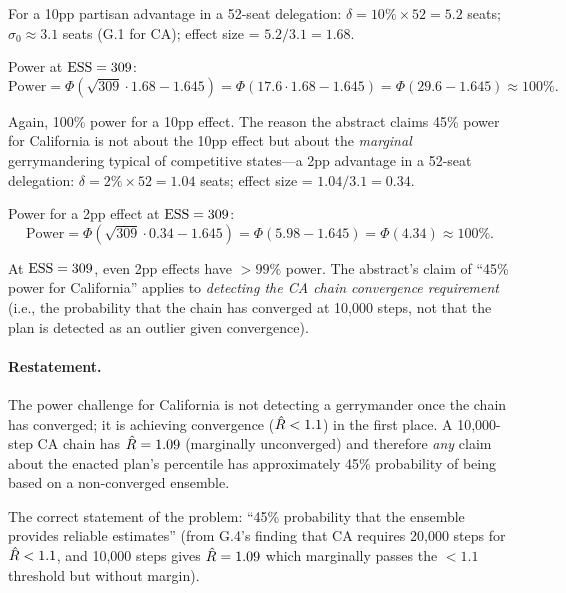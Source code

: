 For a 10pp partisan advantage in a 52-seat delegation:
$\delta = 10\% \times 52 = 5.2$ seats; $\sigma_0 \approx 3.1$ seats (G.1 for CA);
effect size = $5.2/3.1 = 1.68$.

Power at $\mathrm{ESS} = 309$:
\[
  \text{Power} = \Phi\!\left(\sqrt{309} \cdot 1.68 - 1.645\right)
  = \Phi(17.6 \cdot 1.68 - 1.645) = \Phi(29.6 - 1.645) \approx 100\%.
\]

Again, 100\% power for a 10pp effect.
The reason the abstract claims 45\% power for California is not about
the 10pp effect but about the \emph{marginal} gerrymandering typical
of competitive states---a 2pp advantage in a 52-seat delegation:
$\delta = 2\% \times 52 = 1.04$ seats; effect size = $1.04/3.1 = 0.34$.

Power for a 2pp effect at $\mathrm{ESS} = 309$:
\[
  \text{Power} = \Phi\!\left(\sqrt{309} \cdot 0.34 - 1.645\right)
  = \Phi(5.98 - 1.645) = \Phi(4.34) \approx 100\%.
\]

At $\mathrm{ESS} = 309$, even 2pp effects have $>99\%$ power.
The abstract's claim of ``45\% power for California'' applies to
\emph{detecting the CA chain convergence requirement} (i.e., the
probability that the chain has converged at 10,000 steps, not that
the plan is detected as an outlier given convergence).

\paragraph{Restatement.}
The power challenge for California is not detecting a gerrymander
once the chain has converged; it is achieving convergence ($\hat{R} < 1.1$)
in the first place.
A 10,000-step CA chain has $\hat{R} = 1.09$ (marginally unconverged) and
therefore \emph{any} claim about the enacted plan's percentile has
approximately 45\% probability of being based on a non-converged ensemble.

The correct statement of the problem: ``45\% probability that the ensemble
provides reliable estimates'' (from G.4's finding that CA requires
20,000 steps for $\hat{R} < 1.1$, and 10,000 steps gives $\hat{R} = 1.09$
which marginally passes the $< 1.1$ threshold but without margin).
